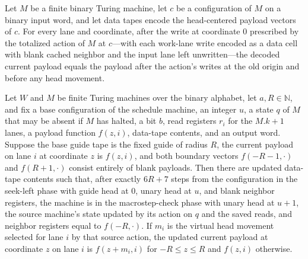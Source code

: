 \begin{lemma}
\label{Complexity.dataCfg_written}
\leanok
{}
Let $M$ be a finite binary Turing machine, let $c$ be a configuration of $M$ on a binary
input word, and let data tapes encode the head-centered payload vectors of $c$. For
every lane and coordinate, after the write at coordinate $0$ prescribed by the totalized
action of $M$ at $c$—with each work-lane write encoded as a data cell with blank cached
neighbor and the input lane left unwritten—the decoded current payload equals the
payload after the action's writes at the old origin and before any head movement.
\end{lemma}

\begin{lemma}
\label{Complexity.dataCfg_sweeps}
\leanok
{}
Let $W$ and $M$ be finite Turing machines over the binary alphabet, let
$a,R\in\mathbb{N}$, and fix a base configuration of the schedule machine, an integer
$u$, a state $q$ of $M$ that may be absent if $M$ has halted, a bit $b$, read registers
$r_i$ for the $M.k+1$ lanes, a payload function $f(z,i)$, data-tape contents, and an
output word. Suppose the base guide tape is the fixed guide of radius $R$, the current
payload on lane $i$ at coordinate $z$ is $f(z,i)$, and both boundary vectors
$f(-R-1,\cdot)$ and $f(R+1,\cdot)$ consist entirely of blank payloads. Then there are
updated data-tape contents such that, after exactly $6R+7$ steps from the configuration
in the seek-left phase with guide head at $0$, unary head at $u$, and blank neighbor
registers, the machine is in the macrostep-check phase with unary head at $u+1$, the
source machine's state updated by its action on $q$ and the saved reads, and neighbor
registers equal to $f(-R,\cdot)$. If $m_i$ is the virtual head movement selected for
lane $i$ by that source action, the updated current payload at coordinate $z$ on lane
$i$ is $f(z+m_i,i)$ for $-R\le z\le R$ and $f(z,i)$ otherwise.
\end{lemma}

